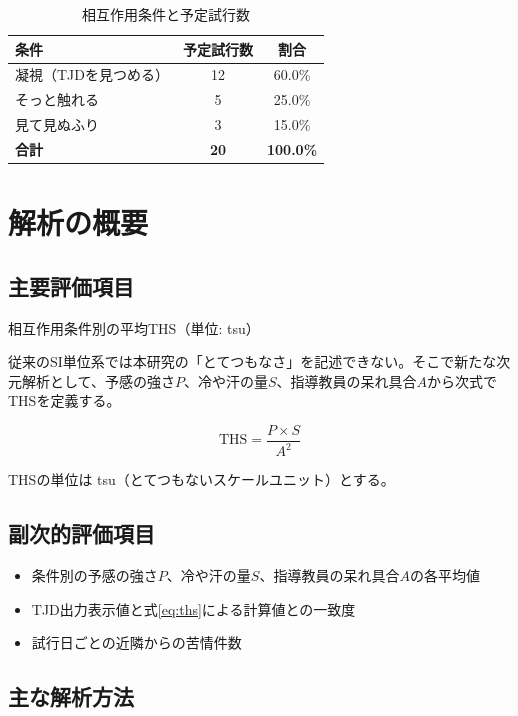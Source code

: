 \documentclass{kyodai-protocol}
\begin{document}
\begin{table}[htbp]
    \centering
    \caption{相互作用条件と予定試行数}
    \label{tab:conditions}
    \begin{tabular}{|l|c|c|}
    \hline
    \textbf{条件} & \textbf{予定試行数} & \textbf{割合} \\ \hline
    凝視（TJDを見つめる） & 12 & 60.0\% \\ \hline
    そっと触れる & 5 & 25.0\% \\ \hline
    見て見ぬふり & 3 & 15.0\% \\ \hline
    \textbf{合計} & \textbf{20} & \textbf{100.0\%} \\ \hline
    \end{tabular}
\end{table}

\section{解析の概要}
\label{sec:analysis}

\subsection{主要評価項目}

相互作用条件別の平均THS（単位: tsu）

従来のSI単位系では本研究の「とてつもなさ」を記述できない。そこで新たな次元解析として、予感の強さ$P$、冷や汗の量$S$、指導教員の呆れ具合$A$から次式でTHSを定義する。

\begin{equation}
\mathrm{THS} = \frac{P \times S}{A^{2}}
\label{eq:ths}
\end{equation}

THSの単位は tsu（とてつもないスケールユニット）とする。

\subsection{副次的評価項目}

\begin{itemize}
\item 条件別の予感の強さ$P$、冷や汗の量$S$、指導教員の呆れ具合$A$の各平均値
\item TJD出力表示値と式\eqref{eq:ths}による計算値との一致度
\item 試行日ごとの近隣からの苦情件数
\end{itemize}

\subsection{主な解析方法}
\end{document}
